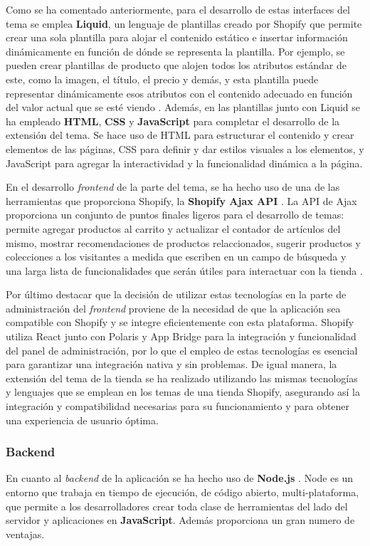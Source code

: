 \documentclass[12pt]{article}
\begin{document}
Como se ha comentado anteriormente, para el desarrollo de estas interfaces del tema se emplea \textbf{Liquid}, un lenguaje de plantillas creado por Shopify que
permite crear una sola plantilla para alojar el contenido estático e insertar información dinámicamente en función de dónde se representa la plantilla.
Por ejemplo, se pueden crear plantillas de producto que alojen todos los atributos estándar de este, como la imagen, el título, el precio y demás, y esta 
plantilla puede representar dinámicamente esos atributos con el contenido adecuado en función del valor actual que se esté viendo \cite{shopify-dev}. 
Además, en las plantillas junto con Liquid se ha empleado \textbf{HTML}, \textbf{CSS} y \textbf{JavaScript} para completar el desarrollo de la extensión del tema. Se hace uso de HTML para estructurar
el contenido y crear elementos de las páginas, CSS para definir y dar estilos visuales a los elementos, y JavaScript para agregar la interactividad y la 
funcionalidad dinámica a la página. 

En el desarrollo \textit{frontend} de la parte del tema, se ha hecho uso de una de las herramientas que proporciona Shopify, la \textbf{Shopify Ajax API} \cite{shopify-ajax-api}. La API de Ajax
proporciona un conjunto de puntos finales ligeros para el desarrollo de temas: permite agregar productos al carrito y actualizar el contador
de artículos del mismo, mostrar recomendaciones de productos relaccionados, sugerir productos y colecciones a los visitantes a medida que escriben
en un campo de búsqueda y una larga lista de funcionalidades que serán útiles para interactuar con la tienda \cite{shopify-dev}.

Por último destacar que la decisión de utilizar estas tecnologías en la parte de administración del \textit{frontend} proviene de la necesidad de que la aplicación sea
compatible con Shopify y se integre eficientemente con esta plataforma. Shopify utiliza React junto con Polaris y App Bridge para la integración
y funcionalidad del panel de administración, por lo que el empleo de estas tecnologías es esencial para garantizar una integración nativa y sin problemas.
De igual manera, la extensión del tema de la tienda se ha realizado utilizando las mismas tecnologías y lenguajes que se emplean en los temas de una
tienda Shopify, asegurando así la integración y compatibilidad necesarias para su funcionamiento y para obtener una experiencia de usuario óptima.

\subsubsection{Backend}
En cuanto al \textit{backend} de la aplicación se ha hecho uso de \textbf{Node.js} \cite{node}. Node es un entorno que trabaja en tiempo de ejecución, de código abierto, multi-plataforma, 
que permite a los desarrolladores crear toda clase de herramientas del lado del servidor y aplicaciones en \textbf{JavaScript}. 
Además proporciona un gran numero de ventajas. 
\end{document}
